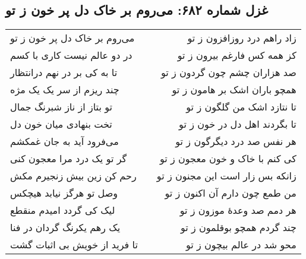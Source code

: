 \begin{center}
\section*{غزل شماره ۶۸۲: می‌روم بر خاک دل پر خون ز تو}
\label{sec:682}
\begin{longtable}{l p{0.5cm} r}
می‌روم بر خاک دل پر خون ز تو
&&
زاد راهم درد روزافزون ز تو
\\
در دو عالم نیست کاری با کسم
&&
کز همه کس فارغم بیرون ز تو
\\
تا به کی بر در نهم درانتظار
&&
صد هزاران چشم چون گردون ز تو
\\
چند ریزم از سر یک یک مژه
&&
همچو باران اشک بر هامون ز تو
\\
تو بتاز از ناز شبرنگ جمال
&&
تا نتازد اشک من گلگون ز تو
\\
تخت بنهادی میان خون دل
&&
تا بگردند اهل دل در خون ز تو
\\
می‌فرود آید به جان غمکشم
&&
هر نفس صد درد دیگرگون ز تو
\\
گر تو یک درد مرا معجون کنی
&&
کی کنم با خاک و خون معجون ز تو
\\
رحم کن زین بیش زنجیرم مکش
&&
زانکه بس زار است این مجنون ز تو
\\
وصل تو هرگز نیابد هیچکس
&&
من طمع چون دارم آن اکنون ز تو
\\
لیک کی گردد امیدم منقطع
&&
هر دمم صد وعدهٔ موزون ز تو
\\
یک رهم یکرنگ گردان در فنا
&&
چند گردم همچو بوقلمون ز تو
\\
تا فرید از خویش بی اثبات گشت
&&
محو شد در عالم بیچون ز تو
\\
\end{longtable}
\end{center}
